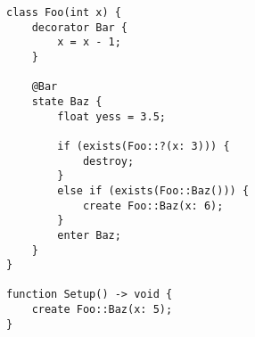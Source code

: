 \documentclass{minimal}
\begin{document}
\begin{verbatim}
class Foo(int x) {
    decorator Bar {
        x = x - 1;
    }

    @Bar
    state Baz {
        float yess = 3.5;

        if (exists(Foo::?(x: 3))) {
            destroy;
        }
        else if (exists(Foo::Baz())) {
            create Foo::Baz(x: 6);
        }
        enter Baz;
    }
}

function Setup() -> void {
    create Foo::Baz(x: 5);
}
\end{verbatim}
\end{document}
